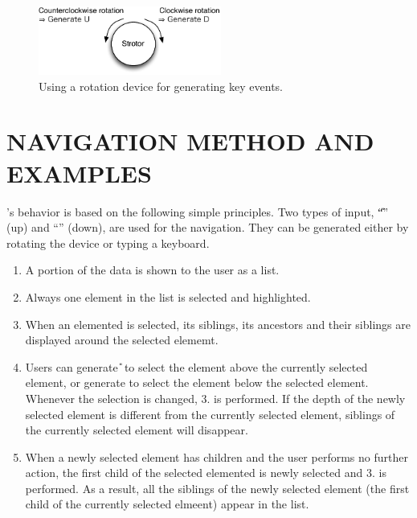 \documentclass{article}
\begin{document}

\begin{figure}[H]
\centerline{\includegraphics[width=60mm,bb=0 0 294 110]{figures/rotation.pdf}}
\caption{Using a rotation device for generating key events.}
\label{rotation}
\end{figure}

\section*{NAVIGATION METHOD AND EXAMPLES}

{\ST}'s behavior is based on the following simple principles.
Two types of input, ``{\U}'' (up) and ``{\D}'' (down), are used for the navigation.
They can be generated either by rotating the {\ST} device or typing a keyboard.

\begin{enumerate}
\item A portion of the data is shown to the user as a list.

\item Always one element in the list is selected and highlighted.


\item When an elemented is selected, its siblings, its ancestors and their siblings are displayed
around the selected elememt.

\item Users can generate {\U} to select the element above the currently selected element,
or generate {\D} to select the element below the selected element.
Whenever the selection is changed, 3. is performed.
If the depth of the newly selected element is different from the currently
selected element, siblings of the currently selected element will disappear.

\item When a newly selected element has children and the user performs no further action,
the first child of the selected elemented is newly selected and 3. is performed.
As a result, all the siblings of the newly selected element
(the first child of the currently selected elmeent) appear in the list.

\end{enumerate}
\end{document}
